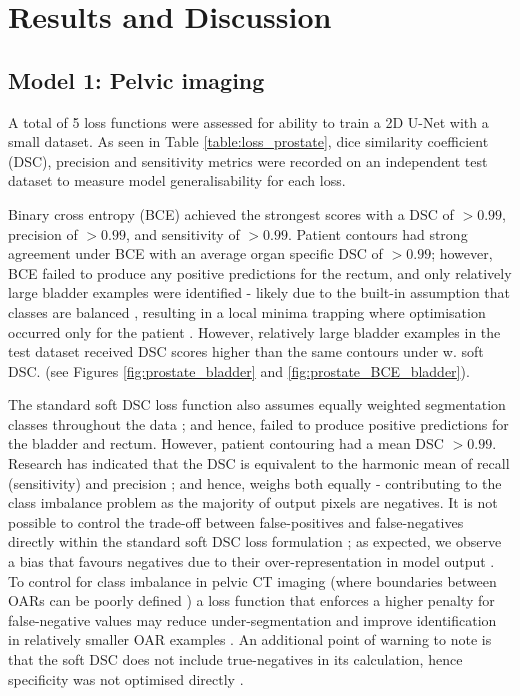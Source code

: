 \chapter{Results and Discussion}
\label{ch:results}

\section{Model 1: Pelvic imaging}
A total of 5 loss functions were assessed for ability to train a 2D U-Net with a small dataset. As seen in Table \ref{table:loss_prostate}, dice similarity coefficient (DSC), precision and sensitivity metrics were recorded on an independent test dataset to measure model generalisability for each loss. 

Binary cross entropy (BCE) achieved the strongest scores with a DSC of $>0.99$, precision of $>0.99$, and sensitivity of $>0.99$. Patient contours had strong agreement under BCE with an average organ specific DSC of $> 0.99$; however, BCE failed to produce any positive predictions for the rectum, and only relatively large bladder examples were identified - likely due to the built-in assumption that classes are balanced \cite{Ronneberger_2015}, resulting in a local minima trapping where optimisation occurred only for the patient \cite{Khan2019}. However, relatively large bladder examples in the test dataset received DSC scores higher than the same contours under w. soft DSC. (see Figures \ref{fig:prostate_bladder} and \ref{fig:prostate_BCE_bladder}).  

The standard soft DSC loss function also assumes equally weighted segmentation classes throughout the data \cite{Sudre_2017}; and hence, failed to produce positive predictions for the bladder and rectum. However, patient contouring had a mean DSC $> 0.99$. Research has indicated that the DSC is equivalent to the harmonic mean of recall (sensitivity) and precision \cite{Bebis2019}; and hence, weighs both equally \cite{Bebis2019} - contributing to the class imbalance problem as the majority of output pixels are negatives. It is not possible to control the trade-off between false-positives and false-negatives directly within the standard soft DSC loss formulation \cite{taghanaki2018};
as expected, we observe a bias that favours negatives due to their over-representation in model output \cite{taghanaki2018}. To control for class imbalance in pelvic CT imaging (where boundaries between OARs can be poorly defined \cite{Liu_2020}) a loss function that enforces a higher penalty for false-negative values may reduce under-segmentation and improve identification in relatively smaller OAR examples \cite{taghanaki2018}. An additional point of warning to note is that the soft DSC does not include true-negatives in its calculation, hence specificity was not optimised directly \cite{taghanaki2018}.

